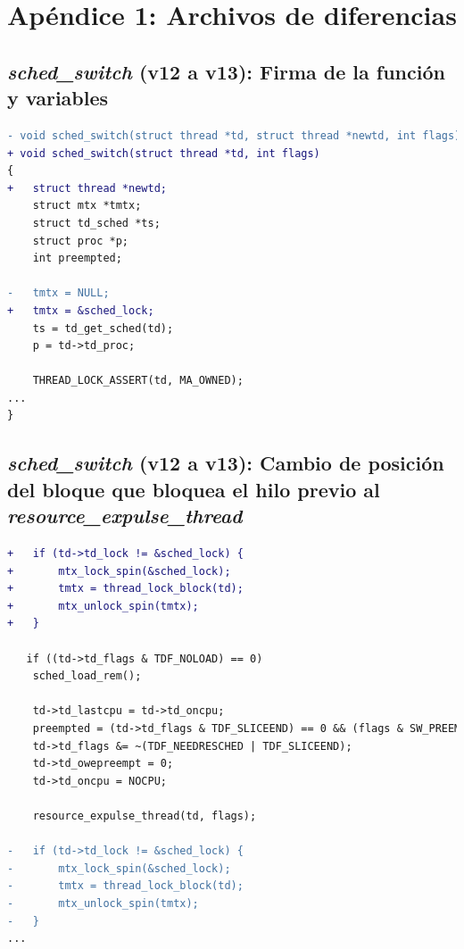 \appendix

\section{Apéndice 1: Archivos de diferencias}\label{appendix:apA}

\subsection{\textit{sched\_switch} (v12 a v13): Firma de la función y variables}\label{appendix:apA1}

\begin{lstlisting}[language=diff]
- void sched_switch(struct thread *td, struct thread *newtd, int flags)
+ void sched_switch(struct thread *td, int flags)
{
+   struct thread *newtd;
    struct mtx *tmtx;
    struct td_sched *ts;
    struct proc *p;
    int preempted;

-   tmtx = NULL;
+   tmtx = &sched_lock;
    ts = td_get_sched(td);
    p = td->td_proc;

    THREAD_LOCK_ASSERT(td, MA_OWNED);
...
}
\end{lstlisting}



\subsection{\textit{sched\_switch} (v12 a v13): Cambio de posición del bloque que bloquea el hilo previo al \textit{resource\_expulse\_thread}}\label{appendix:apA2}

\begin{lstlisting}[language=diff]
+   if (td->td_lock != &sched_lock) {
+   	mtx_lock_spin(&sched_lock);
+   	tmtx = thread_lock_block(td);
+   	mtx_unlock_spin(tmtx);
+   }

   if ((td->td_flags & TDF_NOLOAD) == 0)
   	sched_load_rem();

    td->td_lastcpu = td->td_oncpu;
    preempted = (td->td_flags & TDF_SLICEEND) == 0 && (flags & SW_PREEMPT) != 0;
    td->td_flags &= ~(TDF_NEEDRESCHED | TDF_SLICEEND);
    td->td_owepreempt = 0;
    td->td_oncpu = NOCPU;

    resource_expulse_thread(td, flags);

-   if (td->td_lock != &sched_lock) {
-   	mtx_lock_spin(&sched_lock);
-   	tmtx = thread_lock_block(td);
-   	mtx_unlock_spin(tmtx);
-   }
...
\end{lstlisting}


